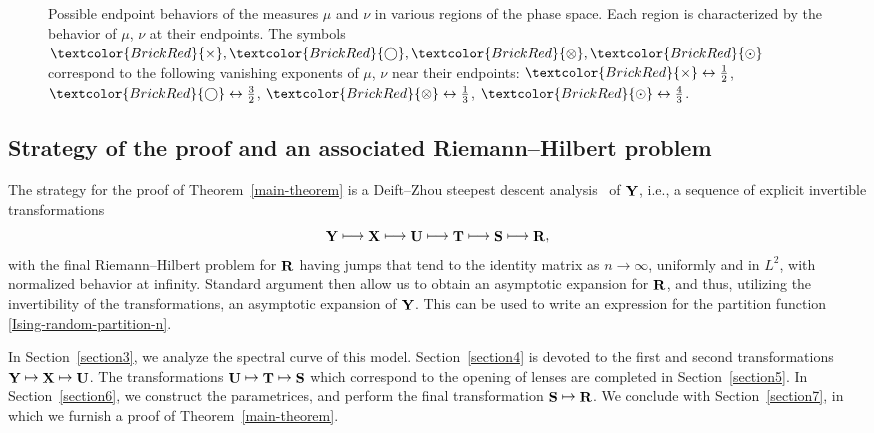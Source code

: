 \documentclass[10pt,a4paper]{amsart}
\DeclareMathOperator{\YY}{{\bf Y}}
\DeclareMathOperator{\XX}{{\bf X}}
\DeclareMathOperator{\TT}{{\bf T}}
\DeclareMathOperator{\UU}{{\bf U}}
\DeclareMathOperator{\boldS}{{\bf S}}
\DeclareMathOperator{\boldR}{{\bf R}}
\numberwithin{equation}{section}
\begin{document}
\begin{figure}[!ht]
 \caption{Possible endpoint behaviors of the measures $\mu$ and $\nu$ in various regions of the phase space. Each region is characterized by the behavior of $\mu$, $\nu$ at their endpoints. The symbols $\textcolor{BrickRed}{\times},\textcolor{BrickRed}{\bigcirc}, \textcolor{BrickRed}{\otimes}, \textcolor{BrickRed}{\odot}$ correspond to the following vanishing exponents of $\mu$, $\nu$ near their endpoints: $\textcolor{BrickRed}{\times} \leftrightarrow \frac{1}{2}$, $\textcolor{BrickRed}{\bigcirc} \leftrightarrow \frac{3}{2}$, $\textcolor{BrickRed}{\otimes} \leftrightarrow \frac{1}{3}$, $\textcolor{BrickRed}{\odot} \leftrightarrow \frac{4}{3}$.}
 \label{tab:SpectralCurveCriticalPhenomenon}
\end{figure}



\subsection{Strategy of the proof and an associated Riemann--Hilbert problem}

The strategy for the proof of Theorem~\ref{main-theorem} is a Deift--Zhou steepest descent analysis~\cite{Deift-Zhou} of $\YY$, i.e., a sequence of explicit invertible transformations
 \begin{equation*}
 \YY\longmapsto\XX\longmapsto\UU\longmapsto\TT\longmapsto\boldS\longmapsto\boldR,
 \end{equation*}
with the final Riemann--Hilbert problem for $\boldR$ having jumps that tend
to the identity matrix as $n\to \infty$, uniformly and in $L^2$, with
normalized behavior at infinity. Standard argument then allow us to obtain an asymptotic expansion for $\boldR$, and thus, utilizing the invertibility of the transformations, an asymptotic expansion of $\YY$. This can be used to write an expression for the partition function \eqref{Ising-random-partition-n}.

In Section~\ref{section3}, we analyze the spectral curve of this model. Section~\ref{section4} is devoted to the first and second transformations $\YY\mapsto\XX\mapsto\UU$. The transformations $\UU\mapsto\TT\mapsto\boldS$ which correspond to the opening of lenses are completed in Section~\ref{section5}. In Section~\ref{section6}, we construct the parametrices, and perform the final transformation $\boldS\mapsto\boldR$. We conclude with Section~\ref{section7}, in which we furnish a proof of Theorem~\ref{main-theorem}.
\end{document}

